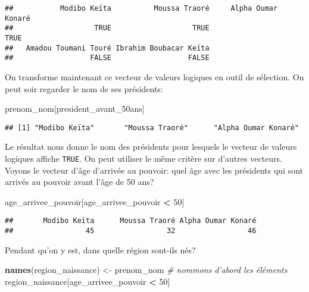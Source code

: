 \documentclass[]{book}
\newenvironment{Shaded}{\begin{snugshade}}{\end{snugshade}}
\newcommand{\KeywordTok}[1]{\textcolor[rgb]{0.13,0.29,0.53}{\textbf{#1}}}
\newcommand{\DecValTok}[1]{\textcolor[rgb]{0.00,0.00,0.81}{#1}}
\newcommand{\StringTok}[1]{\textcolor[rgb]{0.31,0.60,0.02}{#1}}
\newcommand{\CommentTok}[1]{\textcolor[rgb]{0.56,0.35,0.01}{\textit{#1}}}
\newcommand{\OperatorTok}[1]{\textcolor[rgb]{0.81,0.36,0.00}{\textbf{#1}}}
\newcommand{\NormalTok}[1]{#1}
\begin{document}
\begin{verbatim}
##           Modibo Keïta          Moussa Traoré     Alpha Oumar Konaré 
##                   TRUE                   TRUE                   TRUE 
##   Amadou Toumani Touré Ibrahim Boubacar Keïta 
##                  FALSE                  FALSE
\end{verbatim}

On transforme maintenant ce vecteur de valeurs logiques en outil de
sélection. On peut soir regarder le nom de ses présidents:

\begin{Shaded}
\begin{Highlighting}[]
\NormalTok{prenom_nom[president_avant_50ans]}
\end{Highlighting}
\end{Shaded}

\begin{verbatim}
## [1] "Modibo Keïta"       "Moussa Traoré"      "Alpha Oumar Konaré"
\end{verbatim}

Le résultat nous donne le nom des présidents pour lesquels le vecteur de
valeurs logiques affiche \texttt{TRUE}. On peut utiliser le même critère
sur d'autres vecteurs. Voyons le vecteur d'âge d'arrivée au pouvoir:
quel âge avec les présidents qui sont arrivés au pouvoir avant l'âge de
50 ans?

\begin{Shaded}
\begin{Highlighting}[]
\NormalTok{age_arrivee_pouvoir[age_arrivee_pouvoir }\OperatorTok{<}\StringTok{ }\DecValTok{50}\NormalTok{]}
\end{Highlighting}
\end{Shaded}

\begin{verbatim}
##       Modibo Keïta      Moussa Traoré Alpha Oumar Konaré 
##                 45                 32                 46
\end{verbatim}

Pendant qu'on y est, dans quelle région sont-ils nés?

\begin{Shaded}
\begin{Highlighting}[]
\KeywordTok{names}\NormalTok{(region_naissance) <-}\StringTok{ }\NormalTok{prenom_nom }\CommentTok{# nommons d'abord les éléments}
\NormalTok{region_naissance[age_arrivee_pouvoir }\OperatorTok{<}\StringTok{ }\DecValTok{50}\NormalTok{]}
\end{Highlighting}
\end{Shaded}
\end{document}
